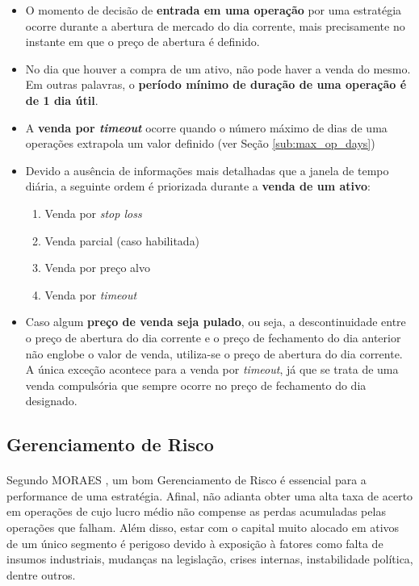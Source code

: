 \begin{itemize}
    \item O momento de decisão de \textbf{entrada em uma operação} por uma estratégia ocorre durante a abertura de mercado do dia corrente, mais precisamente no instante em que o preço de abertura é definido.

    \item No dia que houver a compra de um ativo, não pode haver a venda do mesmo. Em outras palavras, o \textbf{período mínimo de duração de uma operação é de 1 dia útil}.

    \item A \textbf{venda por \textit{timeout}} ocorre quando o número máximo de dias de uma operações extrapola um valor definido (ver Seção \ref{sub:max_op_days})

    \item Devido a ausência de informações mais detalhadas que a janela de tempo diária, a seguinte ordem é priorizada durante a \textbf{venda de um ativo}:

    \begin{enumerate}
        \item Venda por \textit{stop loss}
        \item Venda parcial (caso habilitada)
        \item Venda por preço alvo
        \item Venda por \textit{timeout}
    \end{enumerate}

    \item Caso algum \textbf{preço de venda seja pulado}, ou seja, a descontinuidade entre o preço de abertura do dia corrente e o preço de fechamento do dia anterior não englobe o valor de venda, utiliza-se o preço de abertura do dia corrente. A única exceção acontece para a venda por \textit{timeout}, já que se trata de uma venda compulsória que sempre ocorre no preço de fechamento do dia designado.

\end{itemize}



\FloatBarrier
\subsection{Gerenciamento de Risco}
\label{sub:risk_man}

\paragraph{} Segundo MORAES \cite{moraes2007se}, um bom Gerenciamento de Risco é essencial para a performance de uma estratégia. Afinal, não adianta obter uma alta taxa de acerto em operações de cujo lucro médio não compense as perdas acumuladas pelas operações que falham. Além disso, estar com o capital muito alocado em ativos de um único segmento é perigoso devido à exposição à fatores como falta de insumos industriais, mudanças na legislação, crises internas, instabilidade política, dentre outros.

